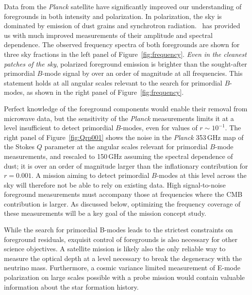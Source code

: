 Data from the \emph{Planck} satellite have significantly improved our
understanding of foregrounds in both intensity and polarization.
In polarization, the sky is dominated by emission 
of dust grains and synchrotron radiation. \planck\ has provided us with much
improved measurements of their amplitude and spectral dependence. The
observed frequency spectra of both foregrounds are shown for three sky
fractions in the left panel of Figure~\ref{fig:frequency}.  \emph{Even
  in the cleanest patches of the sky}, polarized foreground emission
is brighter than the sought-after primordial $B$-mode signal by over
an order of magnitude at all frequencies.  This statement holds at all
angular scales relevant to the search for primordial $B$-modes, as
shown in the right panel of Figure~\ref{fig:frequency}.

Perfect knowledge of the foreground components would enable their
removal from microwave data, but the sensitivity of the \emph{Planck}
measurements limits it at a level insufficient to detect primordial
$B$-modes, even for values of $r\!\sim\!10^{-1}$. The right panel of
Figure~\ref{fig:Qrp001} shows the noise in the \emph{Planck} 353\,GHz
map of the Stokes $Q$ parameter at the angular scales relevant for
primordial $B$-mode measurements, and rescaled to 150\,GHz assuming
the spectral dependence of dust; it is over an order of magnitude
larger than the inflationary contribution for $r=0.001$.  A mission
aiming to detect primordial $B$-modes at this level across the sky
will therefore not be able to rely on existing data. High
signal-to-noise foreground measurements must accompany those at
frequencies where the CMB contribution is larger.  As discussed below,
optimizing the frequency coverage of these measurements will be a key
goal of the mission concept study.

While the search for primordial B-modes leads to the strictest constraints on foreground residuals, exquisit control of foregrounds is also necessary for other science objectives. A satellite mission is likely also the only reliable way to measure the optical depth at a level necessary to break the degeneracy with the neutrino mass. Furthermore, a cosmic variance limited measurement of E-mode polarization on large scales possible with a probe mission would contain valuable information about the star formation history. 

